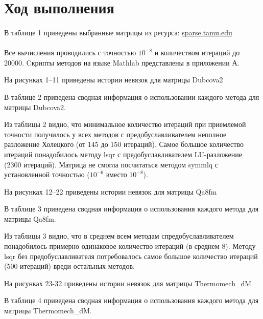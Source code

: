 \section*{Ход выполнения}

\paragraph{}
В таблице 1 приведены выбранные матрицы из ресурса: \href{https://sparse.tamu.edu/}{sparse.tamu.edu}\\

\\

Все вычисления проводились с точностью $10^{-8}$ и количеством итераций до 20000. Cкрипты методов на языке Mathlab представлены в приложении А.

На рисунках 1--11 приведены истории невязок для матрицы Dubcova2



В таблице 2 приведена сводная информация о использовании каждого метода для матрицы Dubcova2.




Из таблицы 2 видно, что минимальное количество итераций при приемлемой точности получилось
у всех методов с предобуславливателем неполное разложение Холецкого (от 145 до 150 итераций).
Самое большое количество итераций понадобилось методу lsqr с предобуславливателем LU-разложение (2300 итераций).
Матрица не смогла посчитаться методом symmlq с установленной точностью ($10^{-6}$  вместо $10^{-8}$).

На рисунках 12--22 приведены истории невязок для матрицы Qa8fm



В таблице 3 приведена сводная информация о использования каждого метода для матрицы Qa8fm.



Из таблицы 3 видно, что в среднем всем методам спредобуславливателем понадобилось примерно одинаковое количество
итераций (в среднем 8).
Методу lsqr без предобуславливателя потребовалось самое большое количество итераций (500 итераций) вреди остальных методов.

На рисунках 23-32 приведены истории невязок для матрицы Thermomech\_dM



В таблице 4 приведена сводная информация о использования каждого метода для матрицы Thermomech\_dM.

